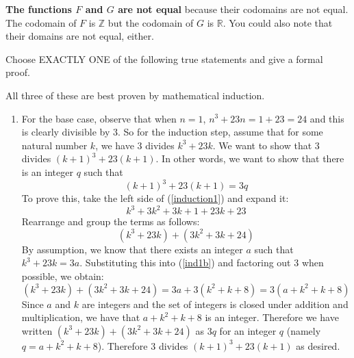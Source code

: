 \documentclass[addpoints]{exam}
\begin{document}
\begin{questions}
\begin{parts}
		\begin{solution}
			\textbf{The functions $F$ and $G$ are not equal} because their codomains are not equal. The codomain of $F$ is $\mathbb{Z}$ but the codomain of $G$ is $\mathbb{R}$. You could also note that their domains are not equal, either. 
		\end{solution}
		
		
	\end{parts}


	
\question[12] Choose EXACTLY ONE of the following true statements and give a formal proof. 

\begin{solution}
	All three of these are best proven by mathematical induction. 
	\begin{enumerate}
		\item For the base case, observe that when $n=1$, $n^3 + 23n = 1 + 23 = 24$ and this is clearly divisible by 3. So for the induction step, assume that for some natural number $k$, we have $3$ divides $k^3 + 23k$. We want to show that $3$ divides $(k+1)^3 + 23(k+1)$. In other words, we want to show that there is an integer $q$ such that 
		\begin{equation}\label{induction1}
			(k+1)^3 + 23(k+1) = 3q
		\end{equation}
	To prove this, take the left side of (\ref{induction1}) and expand it: 
	\[ k^3 + 3k^2 + 3k + 1 + 23k + 23 \]
	Rearrange and group the terms as follows: 
	\begin{equation}\label{ind1b}
		(k^3 + 23k) + (3k^2 + 3k + 24)
	\end{equation}
	By assumption, we know that there exists an integer $a$ such that $k^3 + 23k = 3a$. Substituting this into (\ref{ind1b}) and factoring out 3 when possible, we obtain: 
	\[ (k^3 + 23k) + (3k^2 + 3k + 24) = 3a + 3(k^2 + k + 8) = 3(a + k^2 + k + 8) \]
	Since $a$ and $k$ are integers and the set of integers is closed under addition and multiplication, we have that $a + k^2 + k + 8$ is an integer. Therefore we have written $(k^3 + 23k) + (3k^2 + 3k + 24)$ as $3q$ for an integer $q$ (namely $q = a + k^2 + k + 8$). Therefore $3$ divides $(k+1)^3 + 23(k+1)$ as desired. 
		

\end{enumerate}
\end{solution}
\end{questions}
\end{document}
